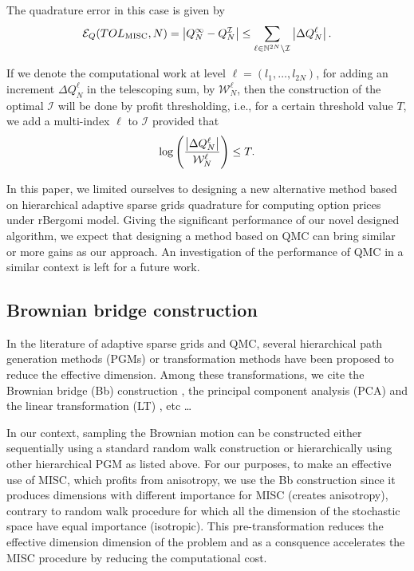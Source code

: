 The quadrature error in this  case  is given by
\begin{equation}\label{eq:quadrature error}
	\mathcal{E}_Q(TOL_{\text{MISC}},N) =\left\lvert Q_N^\infty - Q_N^\mathcal{I}\right\rvert \le \sum_{\ell \in \mathbb{N}^{2N} \setminus
		\mathcal{I}} \left\lvert\Delta Q_N^\ell\right\rvert.
\end{equation}

If we denote the computational work at level $\ell = (l_1, \ldots, l_{2N})$, for adding an increment $\Delta Q_N^{\ell}$
in the telescoping sum, by  $\mathcal{W}_N^\ell$, then the  construction of the optimal  $\mathcal{I}$ will be done by profit thresholding, i.e.,
for a certain threshold value $T$, we add a multi-index $\ell$ to
$\mathcal{I}$ provided that
\begin{equation*}
	\log\left( \frac{\left\lvert\Delta Q_N^\ell\right\rvert}{\mathcal{W}_N^ \ell} \right) \le T.
\end{equation*}


\begin{remark}
	In this paper, we limited ourselves to designing a new alternative method  based on hierarchical adaptive sparse grids quadrature for computing option prices under rBergomi model. Giving the significant performance of our novel designed algorithm, we expect that designing a method based on QMC can bring similar or more gains as  our approach. An investigation of the performance of QMC in a similar context is left for a future work.
\end{remark}



\subsection{Brownian bridge construction}\label{sec:Brwonian bridge construction}
In the literature of adaptive sparse grids and  QMC, several hierarchical path generation methods (PGMs) or transformation methods have been proposed to reduce the effective dimension. Among these transformations, we cite  the Brownian
bridge (Bb)  construction \cite{morokoff1994quasi}, the principal component analysis (PCA)  \cite{acworth1998comparison} and the linear transformation (LT) \cite{imai2004minimizing}, etc \dots  

In our context, sampling the Brownian motion can be constructed either sequentially using a standard random walk construction or hierarchically using   other hierarchical PGM as listed above. For our purposes, to make an effective use of MISC, which profits from anisotropy, we use the Bb construction since it produces  dimensions with different importance for MISC (creates anisotropy), contrary to random walk procedure for which all the dimension of the stochastic space have equal importance (isotropic).  This pre-transformation  reduces the effective dimension dimension  of the problem and as a consquence accelerates the MISC procedure by reducing the computational cost.


